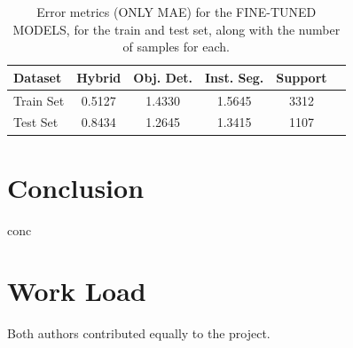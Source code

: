 \documentclass[conference]{IEEEtran}
\begin{document}
\begin{table}[H]
\centering
\caption{Error metrics (ONLY MAE) for the FINE-TUNED MODELS, for the train and test set, along with the number of samples for each.}
\label{tab:model02_results}
\begin{tabular}{lccccc}
\toprule
\textbf{Dataset} & \textbf{Hybrid} & \textbf{Obj. Det.} & \textbf{Inst. Seg.} & \textbf{Support} \\
\midrule
Train Set & 0.5127 & 1.4330 & 1.5645 & 3312 \\
Test Set & 0.8434 & 1.2645 & 1.3415 & 1107 \\
\bottomrule
\end{tabular}
\end{table}


\section{Conclusion}

conc


\section*{Work Load}

Both authors contributed equally to the project.



\end{document}
